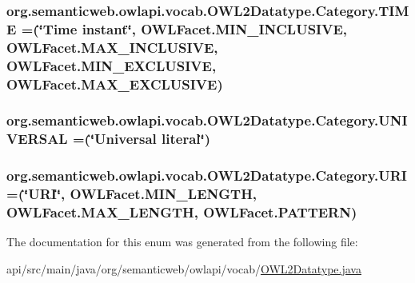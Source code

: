 \hypertarget{enumorg_1_1semanticweb_1_1owlapi_1_1vocab_1_1_o_w_l2_datatype_1_1_category_ab744eaae59f144b9950cf5e14ff8e42e}{
\subsubsection[{T\-I\-M\-E}]{\setlength{\rightskip}{0pt plus 5cm}org.\-semanticweb.\-owlapi.\-vocab.\-O\-W\-L2\-Datatype.\-Category.\-T\-I\-M\-E =(\char`\"{}Time instant\char`\"{}, O\-W\-L\-Facet.\-M\-I\-N\-\_\-\-I\-N\-C\-L\-U\-S\-I\-V\-E, {\bf O\-W\-L\-Facet.\-M\-A\-X\-\_\-\-I\-N\-C\-L\-U\-S\-I\-V\-E}, {\bf O\-W\-L\-Facet.\-M\-I\-N\-\_\-\-E\-X\-C\-L\-U\-S\-I\-V\-E}, {\bf O\-W\-L\-Facet.\-M\-A\-X\-\_\-\-E\-X\-C\-L\-U\-S\-I\-V\-E})}}\label{enumorg_1_1semanticweb_1_1owlapi_1_1vocab_1_1_o_w_l2_datatype_1_1_category_ab744eaae59f144b9950cf5e14ff8e42e}
\hypertarget{enumorg_1_1semanticweb_1_1owlapi_1_1vocab_1_1_o_w_l2_datatype_1_1_category_ace75c06d32c80b721b09d6835a1a3432}{
\subsubsection[{U\-N\-I\-V\-E\-R\-S\-A\-L}]{\setlength{\rightskip}{0pt plus 5cm}org.\-semanticweb.\-owlapi.\-vocab.\-O\-W\-L2\-Datatype.\-Category.\-U\-N\-I\-V\-E\-R\-S\-A\-L =(\char`\"{}Universal literal\char`\"{})}}\label{enumorg_1_1semanticweb_1_1owlapi_1_1vocab_1_1_o_w_l2_datatype_1_1_category_ace75c06d32c80b721b09d6835a1a3432}
\hypertarget{enumorg_1_1semanticweb_1_1owlapi_1_1vocab_1_1_o_w_l2_datatype_1_1_category_a0b2cea4b5db3cac9d91806ba73db9125}{
\subsubsection[{U\-R\-I}]{\setlength{\rightskip}{0pt plus 5cm}org.\-semanticweb.\-owlapi.\-vocab.\-O\-W\-L2\-Datatype.\-Category.\-U\-R\-I =(\char`\"{}U\-R\-I\char`\"{}, O\-W\-L\-Facet.\-M\-I\-N\-\_\-\-L\-E\-N\-G\-T\-H, {\bf O\-W\-L\-Facet.\-M\-A\-X\-\_\-\-L\-E\-N\-G\-T\-H}, {\bf O\-W\-L\-Facet.\-P\-A\-T\-T\-E\-R\-N})}}\label{enumorg_1_1semanticweb_1_1owlapi_1_1vocab_1_1_o_w_l2_datatype_1_1_category_a0b2cea4b5db3cac9d91806ba73db9125}


The documentation for this enum was generated from the following file\-:\begin{DoxyCompactItemize}
\item 
api/src/main/java/org/semanticweb/owlapi/vocab/\hyperlink{_o_w_l2_datatype_8java}{O\-W\-L2\-Datatype.\-java}\end{DoxyCompactItemize}
